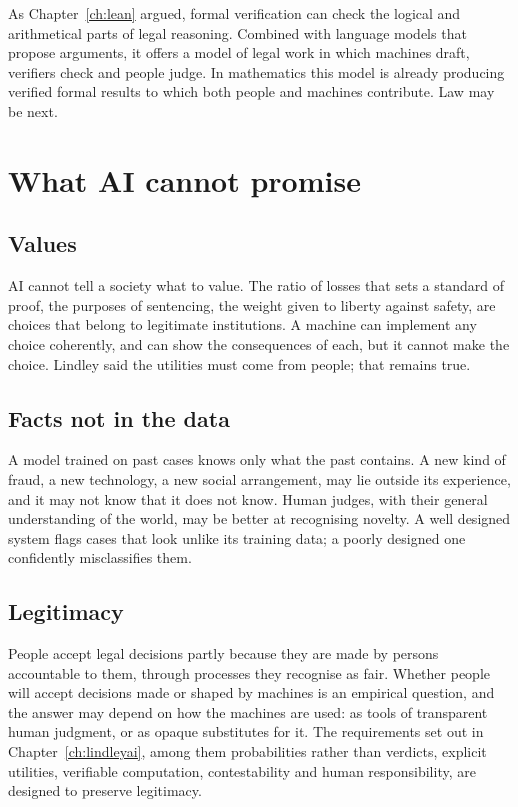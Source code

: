 As Chapter~\ref{ch:lean} argued, formal verification can check the logical and arithmetical parts of legal reasoning. Combined with language models that propose arguments, it offers a model of legal work in which machines draft, verifiers check and people judge. In mathematics this model is already producing verified formal results to which both people and machines contribute. Law may be next.

\section{What AI cannot promise}

\subsection{Values}

AI cannot tell a society what to value. The ratio of losses that sets a standard of proof, the purposes of sentencing, the weight given to liberty against safety, are choices that belong to legitimate institutions. A machine can implement any choice coherently, and can show the consequences of each, but it cannot make the choice. Lindley said the utilities must come from people; that remains true.

\subsection{Facts not in the data}

A model trained on past cases knows only what the past contains. A new kind of fraud, a new technology, a new social arrangement, may lie outside its experience, and it may not know that it does not know. Human judges, with their general understanding of the world, may be better at recognising novelty. A well designed system flags cases that look unlike its training data; a poorly designed one confidently misclassifies them.

\subsection{Legitimacy}

People accept legal decisions partly because they are made by persons accountable to them, through processes they recognise as fair. Whether people will accept decisions made or shaped by machines is an empirical question, and the answer may depend on how the machines are used: as tools of transparent human judgment, or as opaque substitutes for it. The requirements set out in Chapter~\ref{ch:lindleyai}, among them probabilities rather than verdicts, explicit utilities, verifiable computation, contestability and human responsibility, are designed to preserve legitimacy.

